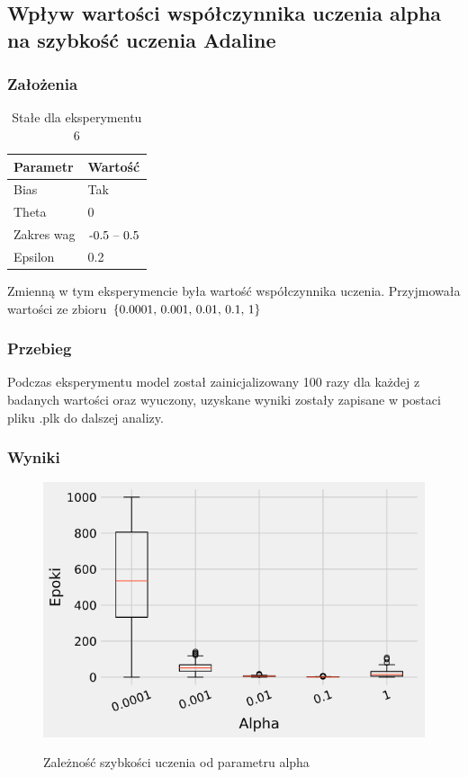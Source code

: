 \documentclass{article}
\begin{document}
\newpage
\subsection{Wpływ wartości współczynnika uczenia alpha na szybkość uczenia Adaline}
\subsubsection*{Założenia}

\begin{table}[!h]
	\caption{Stałe dla eksperymentu 6}
	\label{tabela-const-6}
	\centering
	\begin{tabular}{ll}
		\toprule
		Parametr   & Wartość         \\
		\midrule
		Bias       & Tak               \\
		Theta      & 0                 \\
		Zakres wag & \($-0.5 -- 0.5$\) \\
		Epsilon    & 0.2               \\
		\bottomrule
	\end{tabular}
\end{table}

Zmienną w tym eksperymencie była wartość współczynnika uczenia. Przyjmowała wartości ze zbioru \(\{$0.0001, 0.001, 0.01, 0.1, 1$\}\)

\subsubsection*{Przebieg}

Podczas eksperymentu model został zainicjalizowany 100 razy dla każdej z badanych wartości oraz wyuczony, uzyskane wyniki zostały zapisane w postaci pliku .plk do dalszej analizy.

\subsubsection*{Wyniki}

\begin{figure}[!h]
	\centering
	\caption{Zależność szybkości uczenia od parametru alpha}
	\includegraphics[width=.5\textwidth]{ada_alpha.png}
	\label{fig:res6}
\end{figure}
\end{document}
